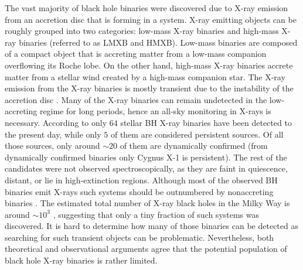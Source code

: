 \documentclass{pracalicmgr}
\begin{document}
The vast majority of black hole binaries were discovered due to X-ray emission from an accretion disc that is forming in a system.
X-ray emitting objects can be roughly grouped into two categories: low-mass X-ray binaries and high-mass X-ray binaries (referred to as LMXB and HMXB).
Low-mass binaries are composed of a compact object that is accreting matter from a low-mass companion overflowing its Roche lobe. On the other hand, high-mass X-ray
binaries accrete matter from a stellar wind created by a high-mass companion star.
The X-ray emission from the X-ray binaries is mostly transient \citep{bambi_transient_2016}
due to the instability of the accretion disc \citep{lasota_disc_2001}. Many of the X-ray binaries can remain undetected in the low-accreting
regime for long periods, hence an all-sky monitoring in X-rays is necessary. According to \citet{corral-santana_blackcat_2016} 
only $64$ stellar BH X-ray binaries have been detected to the present day, while only $5$ of them are considered persistent sources. 
Of all those sources, only around $\sim 20$ of them are dynamically confirmed (from dynamically confirmed binaries only Cygnus X-1 is persistent). 
The rest of the candidates were not observed spectroscopically, as they are faint in quiescence, distant, or lie in high-extinction regions. 
Although most of the observed BH binaries emit X-rays such systems should be outnumbered by nonaccreting binaries \citep{langer_properties_2020}. 
The estimated total number of X-ray black holes in the Milky Way is around $\sim 10^3$ \citep{corral-santana_blackcat_2016}, suggesting that only a tiny fraction
of such systems was discovered. It is hard to determine how many of those binaries can be detected as searching for such transient objects can be problematic.
Nevertheless, both theoretical and observational arguments agree that the potential population of black hole X-ray binaries is rather limited.
\end{document}
